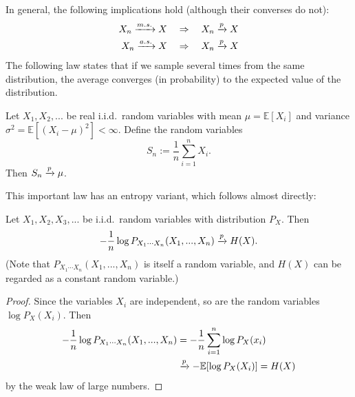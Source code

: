 In general, the following implications hold (although their converses do not):
\begin{align}
X_n \xrightarrow{m.s.} X \ \ \ &\Rightarrow\ \ \  X_n \xrightarrow{p} X\\
X_n \xrightarrow{a.s.} X \ \ \ &\Rightarrow\ \ \  X_n \xrightarrow{p} X
\end{align}
The following law states that if we sample several times from the same distribution, the average converges (in probability) to the expected value of the distribution.
\begin{theorem}
Let $X_1, X_2, ...$ be real i.i.d.\ random variables with mean $\mu = \mathbb{E}[X_i]$ and variance $\sigma^2 = \mathbb{E}[(X_i - \mu)^2] < \infty$. Define the random variables
\[
S_n := \frac{1}{n} \sum_{i=1}^n X_i.
\]
Then $S_n \xrightarrow{p} \mu$.
\end{theorem}
This important law has an entropy variant, which follows almost directly:
\begin{theorem}
Let $X_1, X_2, X_3, ...$ be i.i.d.\ random variables with distribution $P_X$. Then
\[
-\frac{1}{n} \log P_{X_1 \cdots X_n}(X_1, ..., X_n) \xrightarrow{p} H(X).
\]
(Note that $P_{X_1 \cdots X_n}(X_1, ..., X_n)$ is itself a random variable, and $H(X)$ can be regarded as a constant random variable.)
\end{theorem}
\begin{proof}
Since the variables $X_i$ are independent, so are the random variables $\log P_X(X_i)$. Then
\begin{align}
-\frac{1}{n} \log P_{X_1\cdots X_n}(X_1, ..., X_n) &= -\frac{1}{n} \sum_{i=1}^n \log P_X(x_i)\nonumber\\
&\xrightarrow{p} - \mathbb{E}[\log P_X(X_i)] = H(X)
\end{align}
by the weak law of large numbers.
\end{proof}

